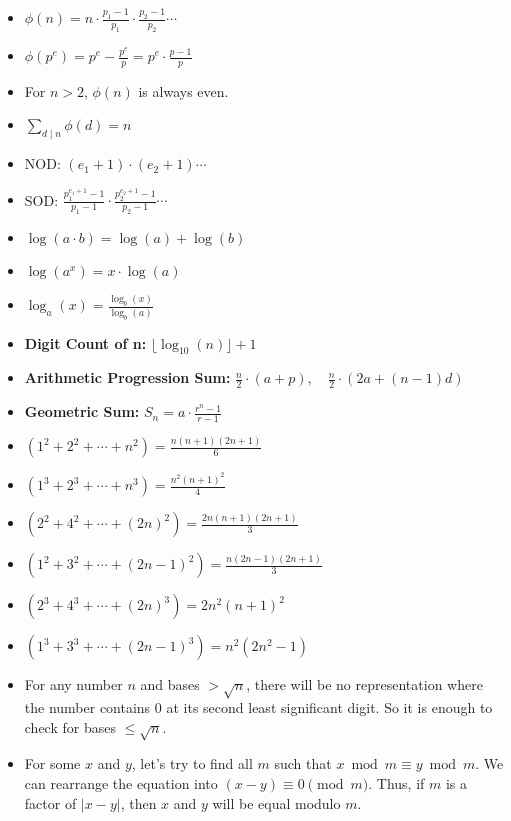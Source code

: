 {\small
\begin{itemize}
\item $\phi(n) = n \cdot \frac{p_1 - 1}{p_1} \cdot \frac{p_2 - 1}{p_2} \cdots$
\item $\phi(p^e) = p^e - \frac{p^e}{p} = p^e \cdot \frac{p-1}{p}$
\item For $n > 2$, $\phi(n)$ is always even.
\item $\sum_{d \mid n} \phi(d) = n$
\item NOD: $(e_1 + 1) \cdot (e_2 + 1) \cdots$
\item SOD: $\frac{p_1^{e_1 + 1} - 1}{p_1 - 1} \cdot \frac{p_2^{e_2 + 1} - 1}{p_2 - 1} \cdots$
\item $\log(a \cdot b) = \log(a) + \log(b)$
\item $\log(a^x) = x \cdot \log(a)$
\item $\log_a(x) = \frac{\log_b(x)}{\log_b(a)}$
\item \textbf{Digit Count of n: } $\lfloor \log_{10}(n) \rfloor + 1$
\item \textbf{Arithmetic Progression Sum: } $\frac{n}{2} \cdot (a + p), \quad \frac{n}{2} \cdot (2a + (n-1)d)$
\item \textbf{Geometric Sum: } $S_n = a \cdot \frac{r^n - 1}{r - 1}$
\item $(1^2 + 2^2 + \cdots + n^2) = \frac{n (n + 1) (2n + 1)}{6}$
\item $(1^3 + 2^3 + \cdots + n^3) = \frac{n^2 (n + 1)^2}{4}$
\item $(2^2 + 4^2 + \cdots + (2n)^2) = \frac{2 n (n + 1) (2n + 1)}{3}$
\item $(1^2 + 3^2 + \cdots + (2n - 1)^2) = \frac{n (2n - 1) (2n + 1)}{3}$
\item $(2^3 + 4^3 + \cdots + (2n)^3) = 2 n^2 (n + 1)^2$
\item $(1^3 + 3^3 + \cdots + (2n - 1)^3) = n^2 (2n^2 - 1)$
\item For any number $n$ and bases $> \sqrt{n}$, there will be no representation where the number contains 0 at its second least significant digit. So it is enough to check for bases $\le \sqrt{n}$.
\item For some $x$ and $y$, let's try to find all $m$ such that $x \bmod m \equiv y \bmod m$. We can rearrange the equation into $(x - y) \equiv 0 \pmod{m}$. Thus, if $m$ is a factor of $|x - y|$, then $x$ and $y$ will be equal modulo $m$.
\end{itemize}
}
